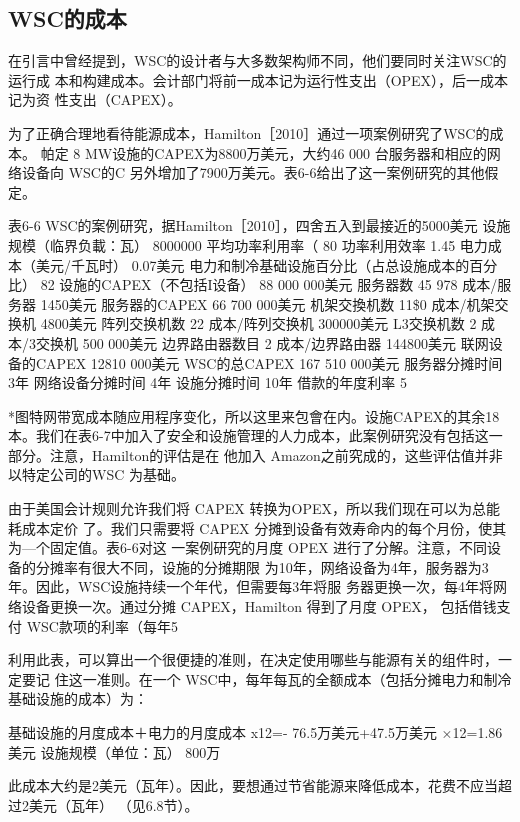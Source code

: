 \subsection{WSC的成本}
在引言中曾经提到，WSC的设计者与大多数架构师不同，他们要同时关注WSC的运行成
本和构建成本。会计部门将前一成本记为运行性支出（OPEX），后一成本记为资
性支出（CAPEX）。

为了正确合理地看待能源成本，Hamilton［2010］通过一项案例研究了WSC的成本。
帕定
8 MW设施的CAPEX为8800万美元，大约46 000 台服务器和相应的网络设备向 WSC的C
另外增加了7900万美元。表6-6给出了这一案例研究的其他假定。

表6-6 WSC的案例研究，据Hamilton［2010］，四舍五入到最接近的5000美元
设施规模（临界负載：瓦）
8000000
平均功率利用率（%
80%
功率利用效率
1.45
电力成本（美元/千瓦时）
0.07美元
电力和制冷基础设施百分比（占总设施成本的百分比）
82%
设施的CAPEX（不包括I设备）
88 000 000美元
服务器数
45 978
成本/服务器
1450美元
服务器的CAPEX
66 700 000美元
机架交換机数
11\$0
成本/机架交换机
4800美元
阵列交换机数
22
成本/阵列交换机
300000美元
L3交换机数
2
成本/3交换机
500 000美元
边界路由器数目
2
成本/边界路由器
144800美元
联网设备的CAPEX
12810 000美元
WSC的总CAPEX
167 510 000美元
服务器分摊时间
3年
网络设备分摊时间
4年
设施分摊时间
10年
借款的年度利率
5%

*图特网带宽成本随应用程序变化，所以这里来包會在内。设施CAPEX的其余18%
本。我们在表6-7中加入了安全和设施管理的人力成本，此案例研究没有包括这一部分。注意，Hamilton的评估是在
他加入 Amazon之前究成的，这些评估值并非以特定公司的WSC 为基础。

由于美国会计规则允许我们将 CAPEX 转换为OPEX，所以我们现在可以为总能耗成本定价
了。我们只需要将 CAPEX 分摊到设备有效寿命内的每个月份，使其为—个固定值。表6-6对这
一案例研究的月度 OPEX 进行了分解。注意，不同设备的分摊率有很大不同，设施的分摊期限
为10年，网络设备为4年，服务器为3年。因此，WSC设施持续一个年代，但需要每3年将服
务器更换一次，每4年将网络设备更换一次。通过分摊 CAPEX，Hamilton 得到了月度 OPEX，
包括借钱支付 WSC款项的利率（每年5%

利用此表，可以算出一个很便捷的准则，在决定使用哪些与能源有关的组件时，一定要记
住这一准则。在一个 WSC中，每年每瓦的全额成本（包括分摊电力和制冷基础设施的成本）为：

基础设施的月度成本＋电力的月度成本 x12=-
76.5万美元+47.5万美元
×12=1.86美元
设施规模（单位：瓦）
800万

此成本大约是2美元（瓦年）。因此，要想通过节省能源来降低成本，花费不应当超过2美元（瓦年）
（见6.8节）。

